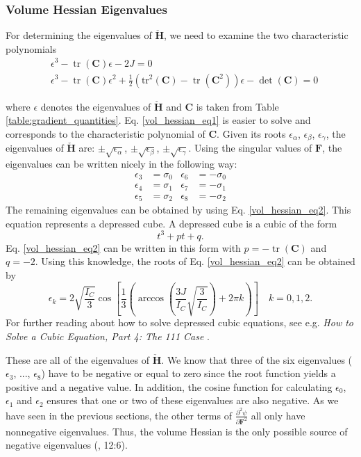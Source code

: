 
\subsubsection{Volume Hessian Eigenvalues}
For determining the eigenvalues of $\mathbf{\check{H}}$, we need to examine the two characteristic polynomials
\begin{align}
&\epsilon^3 - \operatorname{tr}(\mathbf{C}) \epsilon - 2 J = 0  \label{vol_hessian_eq1} \\
&\epsilon^3 - \operatorname{tr}(\mathbf{C}) \epsilon^2 + \frac{1}{2} \left( \operatorname{tr^2}(\mathbf{C}) - \operatorname{tr}(\mathbf{C}^2) \right) \epsilon - \operatorname{det}(\mathbf{C}) = 0 \label{vol_hessian_eq2}
\end{align}

where $\epsilon$ denotes the eigenvalues of $\mathbf{\check{H}}$ and $\mathbf{C}$ is taken from Table \ref{table:gradient_quantities}. Eq. \ref{vol_hessian_eq1} is easier to solve and corresponds to the characteristic polynomial of $\mathbf{C}$. Given its roots $\epsilon_\alpha$, $\epsilon_\beta$, $\epsilon_\gamma$, the eigenvalues of $\mathbf{\check{H}}$ are: $\pm \sqrt{\epsilon_\alpha}$, $\pm \sqrt{\epsilon_\beta}$, $\pm \sqrt{\epsilon_\gamma}$. Using the singular values of $\mathbf{F}$, the eigenvalues can be written nicely in the following way:
\begin{align*}
\epsilon_3 &= \sigma_0 & \epsilon_6 &= -\sigma_0 \\
\epsilon_4 &= \sigma_1 & \epsilon_7 &= -\sigma_1 \\
\epsilon_5 &= \sigma_2 & \epsilon_8 &= -\sigma_2
\end{align*}
The remaining eigenvalues can be obtained by using Eq. \ref{vol_hessian_eq2}. This equation represents a depressed cube. A depressed cube is a cubic of the form
\[
t^3 + pt + q. 
\]
Eq. \ref{vol_hessian_eq2} can be written in this form with $p=-\operatorname{tr}(\mathbf{C})$ and $q= -2$. Using this knowledge, the roots of Eq. \ref{vol_hessian_eq2} can be obtained by
\[
\epsilon_k = 2 \sqrt{\frac{I_C}{3}} \operatorname{cos}\left[ \frac{1}{3} \left( \operatorname{arccos}\left(\frac{3 J}{I_C} \sqrt{\frac{3}{I_C}} \right) + 2 \pi k \right) \right] \quad  k= 0,1,2.
\]
For further reading about how to solve depressed cubic equations, see e.g. \textit{How to Solve a Cubic Equation, Part 4: The 111 Case} \cite{4052506}.

These are all of the eigenvalues of $\mathbf{\check{H}}$. We know that three of the six eigenvalues ($\epsilon_3$, ..., $\epsilon_8$) have to be negative or equal to zero since the root function yields a positive and a negative value. In addition, the cosine function for calculating $\epsilon_0$, $\epsilon_1$ and $\epsilon_2$ ensures that one or two of these eigenvalues are also negative. As we have seen in the previous sections, the other terms of $\frac{\partial^2 \psi}{\partial \mathbf{F}^2}$ all only have nonnegative eigenvalues. Thus, the volume Hessian is the only possible source of negative eigenvalues (\cite{Smith:2018:SNF:3191713.3180491}, 12:6).

